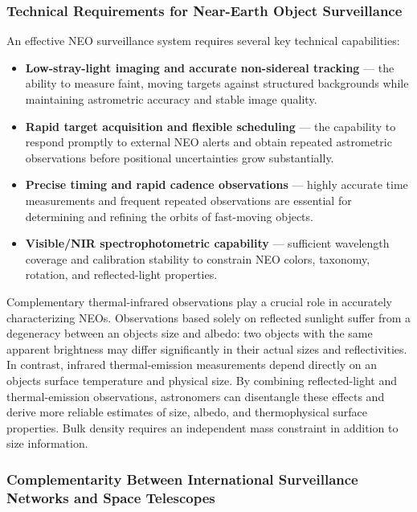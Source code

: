 \subsubsection{Technical Requirements for Near-Earth Object Surveillance}

An effective NEO surveillance system requires several key technical capabilities:

\begin{itemize}
\item
  \textbf{Low-stray-light imaging and accurate non-sidereal tracking} --- the ability to measure faint, moving targets against structured backgrounds while maintaining astrometric accuracy and stable image quality.
\item
  \textbf{Rapid target acquisition and flexible scheduling} --- the capability to respond promptly to external NEO alerts and obtain repeated astrometric observations before positional uncertainties grow substantially.
\item
  \textbf{Precise timing and rapid cadence observations} --- highly accurate time measurements and frequent repeated observations are essential for determining and refining the orbits of fast-moving objects.
\item
  \textbf{Visible/NIR spectrophotometric capability} --- sufficient wavelength coverage and calibration stability to constrain NEO colors, taxonomy, rotation, and reflected-light properties. 
\end{itemize}

Complementary thermal-infrared observations play a crucial role in accurately characterizing NEOs. Observations based solely on reflected sunlight suffer from a degeneracy between an object\textquotesingle s size and albedo: two objects with the same apparent brightness may differ significantly in their actual sizes and reflectivities. In contrast, infrared thermal-emission measurements depend directly on an object\textquotesingle s surface temperature and physical size. By combining reflected-light and thermal-emission observations, astronomers can disentangle these effects and derive more reliable estimates of size, albedo, and thermophysical surface properties. Bulk density requires an independent mass constraint in addition to size information.

\subsubsection{Complementarity Between International Surveillance Networks and Space Telescopes}

